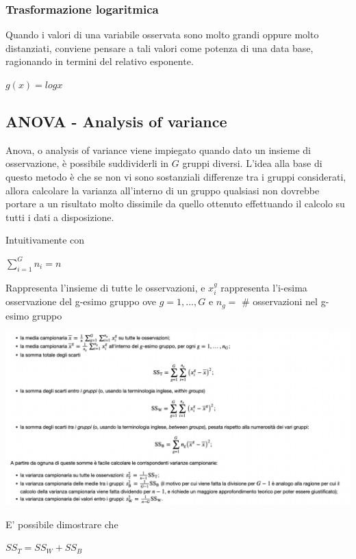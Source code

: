 \subsubsection{Trasformazione logaritmica}
Quando i valori di una variabile osservata sono molto grandi oppure molto distanziati, conviene pensare a tali valori come potenza di una data base, ragionando in termini del relativo esponente.
\begin{center}
$g(x) = log x$
\end{center}

\subsection{ANOVA - Analysis of variance}
Anova, o analysis of variance viene impiegato quando dato un insieme di osservazione, è possibile suddividerli in $G$ gruppi diversi. L'idea alla base di questo metodo è che se non vi sono sostanziali differenze tra i gruppi considerati, allora calcolare la varianza all'interno di un gruppo qualsiasi non dovrebbe portare a un risultato molto dissimile da quello ottenuto effettuando il calcolo su tutti i dati a disposizione.

Intuitivamente con \begin{center}
$\sum_{i=1}^G n_i = n$
\end{center}
Rappresenta l'insieme di tutte le osservazioni, e
$x_i^g$ rappresenta l'i-esima osservazione del g-esimo gruppo
ove $g = 1, ..., G$ e $n_g =$ \# osservazioni nel g-esimo gruppo
\begin{center}
 \includegraphics[scale=0.4]{anova.png}
\end{center}


E' possibile dimostrare che\begin{center}
$SS_T = SS_W + SS_B$
\end{center}





